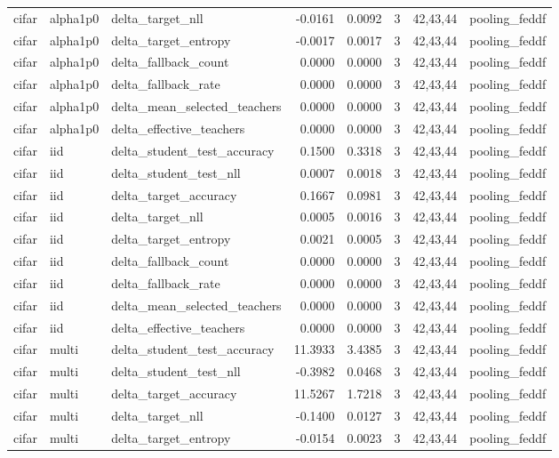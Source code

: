 \begin{tabular}{lllrrrll}
cifar & alpha1p0 & delta\_target\_nll & -0.0161 & 0.0092 & 3 & 42,43,44 & pooling\_feddf \\
cifar & alpha1p0 & delta\_target\_entropy & -0.0017 & 0.0017 & 3 & 42,43,44 & pooling\_feddf \\
cifar & alpha1p0 & delta\_fallback\_count & 0.0000 & 0.0000 & 3 & 42,43,44 & pooling\_feddf \\
cifar & alpha1p0 & delta\_fallback\_rate & 0.0000 & 0.0000 & 3 & 42,43,44 & pooling\_feddf \\
cifar & alpha1p0 & delta\_mean\_selected\_teachers & 0.0000 & 0.0000 & 3 & 42,43,44 & pooling\_feddf \\
cifar & alpha1p0 & delta\_effective\_teachers & 0.0000 & 0.0000 & 3 & 42,43,44 & pooling\_feddf \\
cifar & iid & delta\_student\_test\_accuracy & 0.1500 & 0.3318 & 3 & 42,43,44 & pooling\_feddf \\
cifar & iid & delta\_student\_test\_nll & 0.0007 & 0.0018 & 3 & 42,43,44 & pooling\_feddf \\
cifar & iid & delta\_target\_accuracy & 0.1667 & 0.0981 & 3 & 42,43,44 & pooling\_feddf \\
cifar & iid & delta\_target\_nll & 0.0005 & 0.0016 & 3 & 42,43,44 & pooling\_feddf \\
cifar & iid & delta\_target\_entropy & 0.0021 & 0.0005 & 3 & 42,43,44 & pooling\_feddf \\
cifar & iid & delta\_fallback\_count & 0.0000 & 0.0000 & 3 & 42,43,44 & pooling\_feddf \\
cifar & iid & delta\_fallback\_rate & 0.0000 & 0.0000 & 3 & 42,43,44 & pooling\_feddf \\
cifar & iid & delta\_mean\_selected\_teachers & 0.0000 & 0.0000 & 3 & 42,43,44 & pooling\_feddf \\
cifar & iid & delta\_effective\_teachers & 0.0000 & 0.0000 & 3 & 42,43,44 & pooling\_feddf \\
cifar & multi & delta\_student\_test\_accuracy & 11.3933 & 3.4385 & 3 & 42,43,44 & pooling\_feddf \\
cifar & multi & delta\_student\_test\_nll & -0.3982 & 0.0468 & 3 & 42,43,44 & pooling\_feddf \\
cifar & multi & delta\_target\_accuracy & 11.5267 & 1.7218 & 3 & 42,43,44 & pooling\_feddf \\
cifar & multi & delta\_target\_nll & -0.1400 & 0.0127 & 3 & 42,43,44 & pooling\_feddf \\
cifar & multi & delta\_target\_entropy & -0.0154 & 0.0023 & 3 & 42,43,44 & pooling\_feddf \\

\end{tabular}
